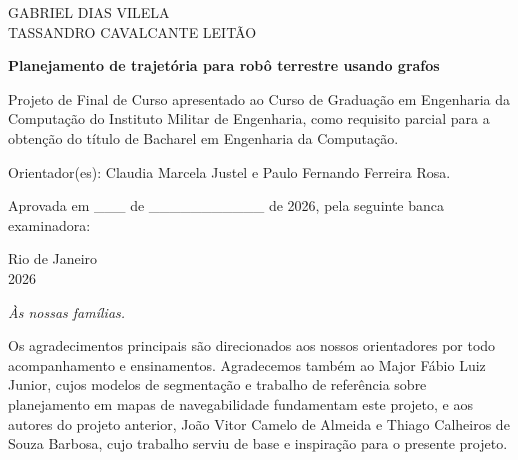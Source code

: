 \documentclass[
    12pt,
    openright,
    oneside,
    a4paper,
    english,
    brazil
]{abntex2}
\begin{document}
\begin{folhadeaprovacao}
    \center

    {\large GABRIEL DIAS VILELA}\\
    {\large TASSANDRO CAVALCANTE LEITÃO}

    \vspace{1cm}

    {\large\bfseries Planejamento de trajetória para robô terrestre usando grafos}

    \vspace{1cm}

    Projeto de Final de Curso apresentado ao Curso de Graduação em Engenharia da Computação do Instituto Militar de Engenharia, como requisito parcial para a obtenção do título de Bacharel em Engenharia da Computação.

    \vspace{0.5cm}

    Orientador(es): Claudia Marcela Justel e Paulo Fernando Ferreira Rosa.

    \vspace{0.5cm}

    Aprovada em \_\_\_ de \_\_\_\_\_\_\_\_\_\_\_ de 2026, pela seguinte banca examinadora:

    \vspace{1.5cm}


    \vfill

    {\large Rio de Janeiro}\\
    {\large 2026}
\end{folhadeaprovacao}

\begin{dedicatoria}
    \vspace*{\fill}
    \centering
    \noindent
    \textit{Às nossas famílias.}
    \vspace*{\fill}
\end{dedicatoria}

\begin{agradecimentos}
Os agradecimentos principais são direcionados aos nossos orientadores por todo acompanhamento e ensinamentos. Agradecemos também ao Major Fábio Luiz Junior, cujos modelos de segmentação e trabalho de referência sobre planejamento em mapas de navegabilidade fundamentam este projeto, e aos autores do projeto anterior, João Vitor Camelo de Almeida e Thiago Calheiros de Souza Barbosa, cujo trabalho serviu de base e inspiração para o presente projeto.
\end{agradecimentos}
\end{document}
